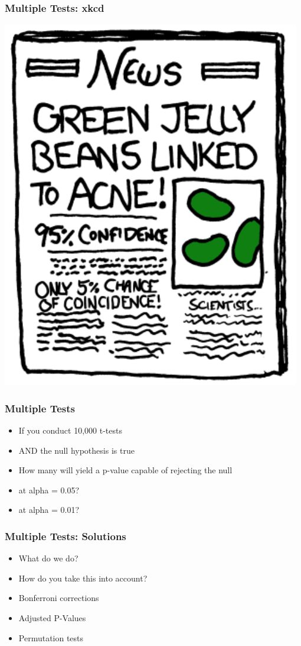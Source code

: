 \documentclass[14pt,handout]{beamer}
\begin{document}
\begin{frame}
\frametitle{Multiple Tests: xkcd}
	\begin{center}
	\includegraphics[width=.6\textwidth]{images_20171128_xkcd_pval3.png}
	\end{center}
\end{frame}

\begin{frame}
\frametitle{Multiple Tests}
\begin{itemize}
	\item<+-> If you conduct 10,000 t-tests
	\item<+-> AND the null hypothesis is true
	\item<+-> How many will yield a p-value capable of rejecting the null
	\item<+-> at alpha = 0.05?
	\item<+-> at alpha = 0.01?  
\end{itemize}
\end{frame}

\begin{frame}
\frametitle{Multiple Tests: Solutions}
\begin{itemize}
	\item<+-> What do we do?
	\item<+-> How do you take this into account?
	\item<+-> Bonferroni corrections
	\item<+-> Adjusted P-Values
	\item<+-> Permutation tests
\end{itemize}
\end{frame}
\end{document}
